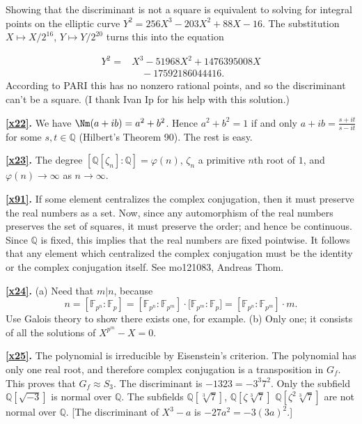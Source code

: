 \documentclass[a4paper,11pt,final,openany]{memoir}
\theoremstyle{nonumberplain}
\begin{document}
Showing that the discriminant is not a square is equivalent to solving for
integral points on the elliptic curve $Y^{2}=256X^{3}-203X^{2}+88X-16$. The
substitution $X\mapsto X/2^{16}$, $Y\mapsto Y/2^{20}$ turns this into the equation%

\begin{align*}
Y^{2}=&X^{3}-51968X^{2}+1476395008X\\
&\quad-17592186044416\text{. }%
\end{align*}
According to PARI this has no nonzero rational points, and so the discriminant
can't be a square. (I thank Ivan Ip for his help with this solution.)

\medskip\noindent\textbf{\ref{x22}.} We have $\Nm(a+ib)=a^{2}+b^{2}$. Hence
$a^{2}+b^{2}=1$ if and only $a+ib=\frac{s+it}{s-it}$ for some $s,t\in
{\mathbb{Q}}$ (Hilbert's Theorem 90). The rest is easy.

\medskip\noindent\textbf{\ref{x23}.} The degree $[{\mathbb{Q}}[\zeta
_{n}]\colon{\mathbb{Q}}]=\varphi(n)$, $\zeta_{n}$ a primitive $n$th root of
$1$, and $\varphi(n)\rightarrow\infty$ as $n\rightarrow\infty$.

\medskip\noindent\textbf{\ref{x91}.} If some element centralizes the complex
conjugation, then it must preserve the real numbers as a set. Now, since any
automorphism of the real numbers preserves the set of squares, it must
preserve the order; and hence be continuous. Since $\mathbb{Q}$ is fixed, this
implies that the real numbers are fixed pointwise. It follows that any element
which centralized the complex conjugation must be the identity or the complex
conjugation itself. See mo121083, Andreas Thom.

\medskip\noindent\textbf{\ref{x24}.} (a) Need that $m|n$, because
\[
n=[\mathbb{F}{}_{p^{n}}\colon\mathbb{F}{}_{p}]=[\mathbb{F}{}_{p^{n}}%
\colon\mathbb{F}{}_{p^{m}}]\cdot\lbrack\mathbb{F}{}_{p^{m}}\colon\mathbb{F}%
{}_{p}]=[\mathbb{F}{}_{p^{n}}\colon\mathbb{F}{}_{p^{m}}]\cdot m.
\]
Use Galois theory to show there exists one, for example. (b) Only one; it
consists of all the solutions of $X^{p^{m}}-X=0$.

\medskip\noindent\textbf{\ref{x25}.} The polynomial is irreducible by
Eisenstein's criterion. The polynomial has only one real root, and therefore
complex conjugation is a transposition in $G_{f}$. This proves that
$G_{f}\approx S_{3}$. The discriminant is $-1323=-3^{3}7^{2}$. Only the
subfield ${\mathbb{Q}}[\sqrt{-3}]$ is normal over ${\mathbb{Q}}$. The
subfields ${\mathbb{Q}}[\sqrt[3]{7}]$, ${\mathbb{Q}}[\zeta\sqrt[3]{7}]$
${\mathbb{Q}}[\zeta^{2}\sqrt[3]{7}]$ are not normal over ${\mathbb{Q}}$. [The
discriminant of $X^{3}-a$ is $-27a^{2}=-3(3a)^{2}$.]
\end{document}
